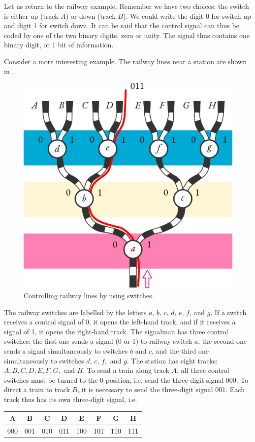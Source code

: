 Let us return to the railway example. Remember we have two choices:
the switch is either up (track $A$) or down (track $B$). We could write the
digit 0 for switch up and digit 1 for switch down. It can be said that the
control signal can thus be coded by one of the two binary digits, zero or
unity. The signal thus contains one binary digit, or 1 bit of information.

Consider a more interesting example. The railway lines near a station
are shown in . 

\begin{figure}[!ht]
 \centering
 \includegraphics[width=0.8\tfwidth]{figures/railway-switches.pdf}
\caption{Controlling railway lines by using switches.\label{railway-switches}}
 \end{figure}

The railway switches are labelled by the letters $a, \,
b, \, c, \, d, \, e, \, f$, and $g$. If a switch receives a control signal of 0, it opens the left-hand track, and if it receives a signal of 1, it opens the right-hand
track. The signalman has three control switches: the first one sends
a signal (0 or 1) to railway switch $a$, the second one sends a signal
simultaneously to switches $b$ and $c$, and the third one simultaneously to
switches $d, \, e, \, f,$ and $g$. The station has eight tracks: $A, B, C, D, E, F, G,$ and $H$. To send a train along track $A$, all three control switches must be turned to the 0 position, i.e. send the three-digit signal 000. To direct
a train to track $B$, it is necessary to send the three-digit signal 001. Each
track thus has its own three-digit signal, i.e.
\begin{center}
\setlength\arrayrulewidth{0.75pt}
\begin{tabular}{cccccccc}
\toprule
A & B & C & D & E & F & G & H\\
\midrule
000 & 001 & 010 & 011 & 100 & 101 & 110 & 111 \\
\bottomrule
\end{tabular}
\end{center}

